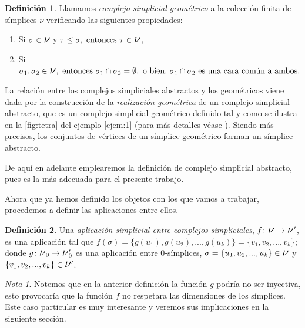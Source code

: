 \documentclass[12pt, a4paper, twoside]{book}
\numberwithin{equation}{section}
\theoremstyle{definition}
\newtheorem{defi}{Definición}[section]
\theoremstyle{remark}
\newtheorem*{remark}{Nota}
\theoremstyle{plain}
\begin{document}
	\begin{defi}
		Llamamos \textit{complejo simplicial geométrico} a la 
		colección finita de símplices {\Large $\nu$} verificando las
		siguientes propiedades:
		\begin{enumerate}
			\item Si $\sigma\in \text{{\Large $\nu$} y }
				\tau \leq \sigma, \text{ entonces }  \tau \in 
				\text{{\Large $\nu$}}$,
			\item Si $\sigma_{1},\sigma_{2} \in 
				\text{{\Large $\nu$}}, \text{ entonces } 
				\sigma_{1}\cap\sigma_{2}=\emptyset, 
				\text{ o bien, }
				\sigma_{1}\cap\sigma_{2} \text{ es una cara 
				común a ambos.}$
		\end{enumerate}
	\end{defi}
	
	La relación entre los complejos simpliciales abstractos y los 
	geométricos viene dada por la construcción de la \emph{realización
	geométrica} de un complejo simplicial abstracto, que es un complejo 
	simplicial geométrico definido tal y como se ilustra en la 
	\autoref{fig:tetra} del ejemplo \ref{ejem:1} (para más detalles véase 
	\cite{TopoAlg-Edelsbrunner}). Siendo más precisos, los conjuntos de 
	vértices de un símplice geométrico forman un símplice abstracto.

	De aquí en adelante emplearemos la definición de complejo simplicial 
	abstracto, pues es la más adecuada para el presente trabajo.

	Ahora que ya hemos definido los objetos con los que vamos a trabajar, 
	procedemos a definir las aplicaciones entre ellos.
	\begin{defi}
		Una \textit{aplicación simplicial entre complejos 
		simpliciales}, $f\colon\text{{\Large $\nu$}} \rightarrow 
		\text{{\Large $\nu$}$^{\prime}$}$, es una aplicación 
		tal que $f(\sigma)=\{g(u_{1}),g(u_{2}),...,g(u_{k})\}=
		\{v_{1},v_{2},...,v_{k}\}$; donde
		$g\colon\text{{\Large $\nu$}$_{0}$} \rightarrow \text{{\Large 
		$\nu$}$_{0}^{\prime}$}$ es una aplicación entre $0$-símplices,
		$\sigma=\{u_{1},u_{2},...,u_{k}\} \in \text{{\Large $\nu$}}$
		y $\{v_{1},v_{2},...,v_{k}\} \in \text{{\Large $\nu$}$^{
		\prime}$}$.	
	\end{defi}

	\begin{remark}
	Notemos que en la anterior definición la función $g$ podría no ser 
	inyectiva, esto provocaría que la función $f$ no respetara las 
	dimensiones de los símplices. Este caso particular es muy interesante 
	y veremos sus implicaciones en la siguiente sección.
	\end{remark}
	
\end{document}
